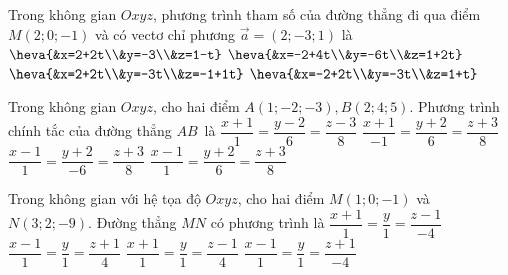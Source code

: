 \begin{ex}%
	Trong không gian $Oxyz$, phương trình tham số của đường thẳng đi qua điểm $M(2;0;-1)$ và có vectơ chỉ phương  $\overrightarrow{a}=(2;-3;1)$ là
	 \choice
		 {$\heva{&x=2+2t\\&y=-3\\&z=1-t}$}
		 {$\heva{&x=-2+4t\\&y=-6t\\&z=1+2t}$}
		 {\True$\heva{&x=2+2t\\&y=-3t\\&z=-1+1t}$}
		{$\heva{&x=-2+2t\\&y=-3t\\&z=1+t}$} 
\end{ex}

\begin{ex}%
	Trong không gian $ Oxyz$, cho hai điểm $ A\left(1;-2;-3\right),B\left(2;4;5\right)$. Phương trình chính tắc của đường thẳng $ AB$~là 
	 \choice
		{$\dfrac{x+1}{1}=\dfrac{y-2}{6}=\dfrac{z-3}{8}$} 
		{$\dfrac{x+1}{-1}=\dfrac{y+2}{6}=\dfrac{z+3}{8}$} 
		{$\dfrac{x-1}{1}=\dfrac{y+2}{-6}=\dfrac{z+3}{8}$} 
		 {\True $\dfrac{x-1}{1}=\dfrac{y+2}{6}=\dfrac{z+3}{8}$}
\end{ex}

\begin{ex}%
	Trong không gian với hệ tọa  độ $Oxyz$, cho hai điểm $M(1; 0; -1)$ và $N(3; 2; -9)$. Đường thẳng $MN$ có phương trình là
	 \choice
		{$\dfrac{x+1}{1} = \dfrac{y}{1} = \dfrac{z-1}{-4}$} 
		{$\dfrac{x-1}{1} = \dfrac{y}{1} =  \dfrac{z+1}{4}$}
		{$\dfrac{x+1}{1} = \dfrac{y}{1}  = \dfrac{z-1}{4}$}
		 {\True $\dfrac{x-1}{1} = \dfrac{y}{1} = \dfrac{z+1}{-4}$}
\end{ex}

